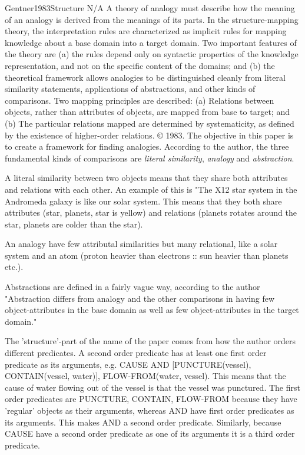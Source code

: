 \begin{review}{Gentner1983Structure}
        {N/A}
        {
            A theory of analogy must describe how the meaning of an analogy is derived from the meanings of its parts. 
            In the structure-mapping theory, the interpretation rules are characterized as implicit rules for mapping knowledge about a base domain into a target domain. 
            Two important features of the theory are (a) the rules depend only on syntactic properties of the knowledge representation, and not on the specific content of the domains; and (b) the theoretical framework allows analogies to be distinguished cleanly from literal similarity statements, applications of abstractions, and other kinds of comparisons. 
            Two mapping principles are described: (a) Relations between objects, rather than attributes of objects, are mapped from base to target; and (b) The particular relations mapped are determined by systematicity, as defined by the existence of higher-order relations. © 1983.
        }
    The objective in this paper is to create a framework for finding analogies.
    According to the author, the three fundamental kinds of comparisons are \emph{literal similarity}, \emph{analogy} and \emph{abstraction}.
    
    A literal similarity between two objects means that they share both attributes and relations with each other.
    An example of this is "The X12 star system in the Andromeda galaxy is like our solar system.
    This means that they both share attributes (star, planets, star is yellow) and relations (planets rotates around the star, planets are colder than the star).
    
    An analogy have few attributal similarities but many relational, like a solar system and an atom (proton heavier than electrons :: sun heavier than planets etc.).
    
    Abstractions are defined in a fairly vague way, according to the author "Abstraction differs from analogy and the other comparisons in having few object-attributes in the base domain as well as few object-attributes in the target domain."
    
    The 'structure'-part of the name of the paper comes from how the author orders different predicates.
    A second order predicate has at least one first order predicate as its arguments, e.g. CAUSE {AND [PUNCTURE(vessel), CONTAIN(vessel, water)], FLOW-FROM(water, vessel)}.
    This means that the cause of water flowing out of the vessel is that the vessel was punctured.
    The first order predicates are PUNCTURE, CONTAIN, FLOW-FROM because they have 'regular' objects as their arguments, whereas AND have first order predicates as its arguments.
    This makes AND a second order predicate.
    Similarly,  because CAUSE have a second order predicate as one of its arguments it is a third order predicate.
    

\end{review}
